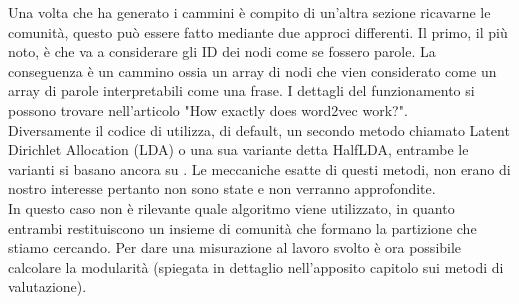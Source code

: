 %
Una volta che \nv ha generato i cammini è compito di un'altra sezione ricavarne le comunità, questo può essere fatto mediante due approci differenti. Il primo, il più noto, è \wv che va a considerare gli ID dei nodi come se fossero parole. La conseguenza è un cammino ossia un array di nodi che vien considerato come un array di parole interpretabili come una frase. I dettagli del funzionamento si possono trovare nell'articolo "How exactly does word2vec work?"\cite{W2V_paper}.\\
Diversamente il codice di \cnrl utilizza, di default, un secondo metodo chiamato Latent Dirichlet Allocation (LDA)\cite{LDA} o una sua variante detta HalfLDA, entrambe le varianti si basano ancora su \wv. Le meccaniche esatte di questi metodi, non erano di nostro interesse pertanto non sono state e non verranno approfondite.\\
In questo caso non è rilevante quale algoritmo viene utilizzato, in quanto entrambi restituiscono un insieme di comunità che formano la partizione che stiamo cercando. Per dare una misurazione al lavoro svolto è ora possibile calcolare la modularità (spiegata in dettaglio nell'apposito capitolo sui metodi di valutazione).
%
